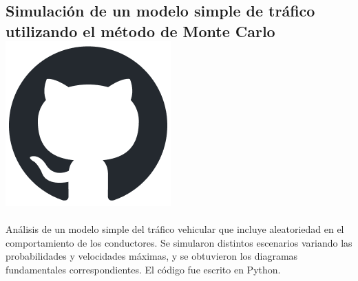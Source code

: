 \subsection{Simulación de un modelo simple de tráfico utilizando el método de Monte Carlo 
\hspace{0.1 cm} \href{https://github.com/juanjogervasio/Monte-Carlo-traffic-simulation}{\includegraphics[scale=0.2]{github-mark.png}}
}
Análisis de un modelo simple del tráfico vehicular que incluye aleatoriedad en el comportamiento de los conductores. Se simularon distintos escenarios variando las probabilidades y velocidades máximas, y se obtuvieron los diagramas fundamentales correspondientes. El código fue escrito en Python.

